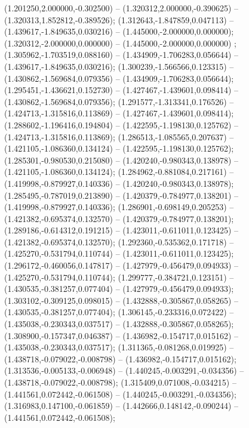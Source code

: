  (1.201250,2.000000,-0.302500) -- (1.320312,2.000000,-0.390625) -- (1.320313,1.852812,-0.389526);
 (1.312643,-1.847859,0.047113) -- (1.439617,-1.849635,0.030216) -- (1.445000,-2.000000,0.000000);
 (1.320312,-2.000000,0.000000) -- (1.445000,-2.000000,0.000000) ;
 (1.305962,-1.703519,0.088160) -- (1.434909,-1.706283,0.056644) -- (1.439617,-1.849635,0.030216);
 (1.300239,-1.566566,0.123315) -- (1.430862,-1.569684,0.079356) -- (1.434909,-1.706283,0.056644);
 (1.295451,-1.436621,0.152730) -- (1.427467,-1.439601,0.098414) -- (1.430862,-1.569684,0.079356);
 (1.291577,-1.313341,0.176526) -- (1.424713,-1.315816,0.113869) -- (1.427467,-1.439601,0.098414);
 (1.288602,-1.196416,0.194804) -- (1.422595,-1.198130,0.125762) -- (1.424713,-1.315816,0.113869);
 (1.286513,-1.085565,0.207637) -- (1.421105,-1.086360,0.134124) -- (1.422595,-1.198130,0.125762);
 (1.285301,-0.980530,0.215080) -- (1.420240,-0.980343,0.138978) -- (1.421105,-1.086360,0.134124);
 (1.284962,-0.881084,0.217161) -- (1.419998,-0.879927,0.140336) -- (1.420240,-0.980343,0.138978);
 (1.285495,-0.787019,0.213890) -- (1.420379,-0.784977,0.138201) -- (1.419998,-0.879927,0.140336);
 (1.286901,-0.698149,0.205253) -- (1.421382,-0.695374,0.132570) -- (1.420379,-0.784977,0.138201);
 (1.289186,-0.614312,0.191215) -- (1.423011,-0.611011,0.123425) -- (1.421382,-0.695374,0.132570);
 (1.292360,-0.535362,0.171718) -- (1.425270,-0.531794,0.110744) -- (1.423011,-0.611011,0.123425);
 (1.296172,-0.460056,0.147817) -- (1.427979,-0.456479,0.094933) -- (1.425270,-0.531794,0.110744);
 (1.299777,-0.384721,0.123151) -- (1.430535,-0.381257,0.077404) -- (1.427979,-0.456479,0.094933);
 (1.303102,-0.309125,0.098015) -- (1.432888,-0.305867,0.058265) -- (1.430535,-0.381257,0.077404);
 (1.306145,-0.233316,0.072422) -- (1.435038,-0.230343,0.037517) -- (1.432888,-0.305867,0.058265);
 (1.308900,-0.157347,0.046387) -- (1.436982,-0.154717,0.015162) -- (1.435038,-0.230343,0.037517);
 (1.311365,-0.081268,0.019925) -- (1.438718,-0.079022,-0.008798) -- (1.436982,-0.154717,0.015162);
 (1.313536,-0.005133,-0.006948) -- (1.440245,-0.003291,-0.034356) -- (1.438718,-0.079022,-0.008798);
 (1.315409,0.071008,-0.034215) -- (1.441561,0.072442,-0.061508) -- (1.440245,-0.003291,-0.034356);
 (1.316983,0.147100,-0.061859) -- (1.442666,0.148142,-0.090244) -- (1.441561,0.072442,-0.061508);

